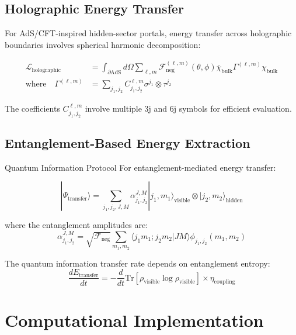 \documentclass[12pt]{article}
\begin{document}
\subsection{Holographic Energy Transfer}

For AdS/CFT-inspired hidden-sector portals, energy transfer across holographic boundaries involves spherical harmonic decomposition:

\begin{align}
\mathcal{L}_{\text{holographic}} &= \int_{\partial \text{AdS}} d\Omega \sum_{\ell,m} \mathcal{F}_{\text{neg}}^{(\ell,m)}(\theta,\phi) \bar{\chi}_{\text{bulk}} \Gamma^{(\ell,m)} \chi_{\text{bulk}} \\
\text{where} \quad \Gamma^{(\ell,m)} &= \sum_{j_1,j_2} C_{j_1,j_2}^{\ell,m} \sigma^{j_1} \otimes \tau^{j_2}
\end{align}

The coefficients $C_{j_1,j_2}^{\ell,m}$ involve multiple 3j and 6j symbols for efficient evaluation.

\subsection{Entanglement-Based Energy Extraction}

\begin{resultbox}{Quantum Information Protocol}
For entanglement-mediated energy transfer:

\begin{equation}
|\Psi_{\text{transfer}}\rangle = \sum_{j_1,j_2,J,M} \alpha_{j_1,j_2}^{J,M} |j_1,m_1\rangle_{\text{visible}} \otimes |j_2,m_2\rangle_{\text{hidden}}
\end{equation}

where the entanglement amplitudes are:
\begin{equation}
\alpha_{j_1,j_2}^{J,M} = \sqrt{\mathcal{F}_{\text{neg}}} \sum_{m_1,m_2} \langle j_1 m_1; j_2 m_2 | J M \rangle \phi_{j_1,j_2}(m_1,m_2)
\end{equation}

The quantum information transfer rate depends on entanglement entropy:
\begin{equation}
\frac{dE_{\text{transfer}}}{dt} = -\frac{d}{dt} \text{Tr}[\rho_{\text{visible}} \log \rho_{\text{visible}}] \times \eta_{\text{coupling}}
\end{equation}
\end{resultbox}

\section{Computational Implementation}
\end{document}
